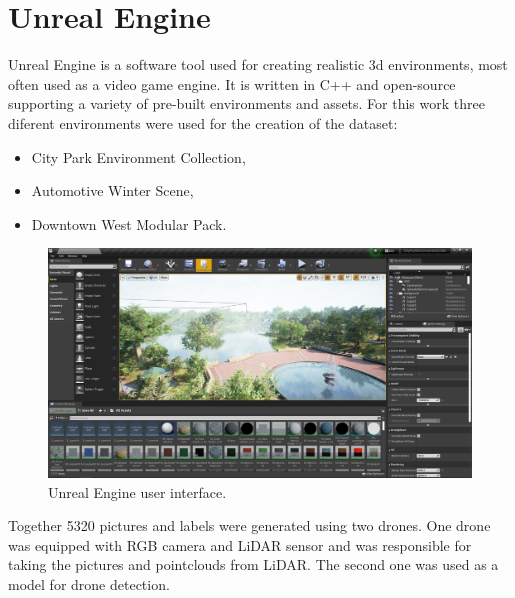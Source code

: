 \documentclass[twoside]{ctuthesis}
\theoremstyle{plain}
\theoremstyle{definition}
\theoremstyle{note}
\begin{document}
\section{Unreal Engine}
Unreal Engine is a software tool used for creating realistic 3d environments, most often used as a video game engine.
It is written in C++ and open-source supporting a variety of pre-built environments and assets. For this work three diferent environments were used for the creation of the dataset:
\begin{itemize}
	\item City Park Environment Collection,
	\item Automotive Winter Scene,
	\item Downtown West Modular Pack.
\end{itemize}
\pagebreak
\begin{figure}[h]
	\centering
	\includegraphics[width=\textwidth]{unreal_ui.png}
	\caption{Unreal Engine user interface.}
\end{figure}
Together 5320 pictures and labels were generated using two drones. One drone was equipped with RGB camera and LiDAR sensor and was responsible for taking the pictures and pointclouds from LiDAR. The second one was used as a model for drone detection.
\end{document}
